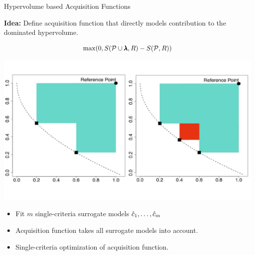 \begin{frame}{Hypervolume based Acquisition Functions}

    \textbf{Idea:} Define acquisition function that directly models contribution to the dominated hypervolume.

            $$
            \max(0, S(\mathcal{P} \cup \pmb{\lambda}, R) - S(\mathcal{P}, R))
            $$
    \begin{center}
        \includegraphics[scale=0.22]{images/hv_contribution}
    \end{center}

    \begin{itemize}
            \item Fit $m$ single-criteria surrogate models $\hat{c}_1, \dots, \hat{c}_m$
            \item Acquisition function takes all surrogate models into account.
            \item Single-criteria optimization of acquisition function.
    \end{itemize}

\end{frame}

